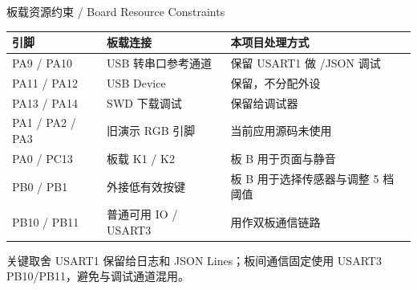 \documentclass[aspectratio=169,10pt]{ctexbeamer}
\newcommand{\code}[1]{\texttt{\small\detokenize{#1}}}
\begin{document}
\begin{frame}{板载资源约束 / Board Resource Constraints}
  \small
  \begin{tabularx}{\textwidth}{@{}p{}p{}Y@{}}
    \toprule
    引脚 & 板载连接 & 本项目处理方式 \\
    \midrule
    PA9 / PA10 & USB 转串口参考通道 & 保留 USART1 做 \code{printf}/JSON 调试 \\
    PA11 / PA12 & USB Device & 保留，不分配外设 \\
    PA13 / PA14 & SWD 下载调试 & 保留给调试器 \\
    PA1 / PA2 / PA3 & 旧演示 RGB 引脚 & 当前应用源码未使用 \\
    PA0 / PC13 & 板载 K1 / K2 & 板 B 用于页面与静音 \\
    PB0 / PB1 & 外接低有效按键 & 板 B 用于选择传感器与调整 5 档阈值 \\
    PB10 / PB11 & 普通可用 IO / USART3 & 用作双板通信链路 \\
    \bottomrule
  \end{tabularx}
  \vspace{0.5em}
  \begin{alertblock}{关键取舍}
    USART1 保留给日志和 JSON Lines；板间通信固定使用 USART3 PB10/PB11，避免与调试通道混用。
  \end{alertblock}
\end{frame}
\end{document}
